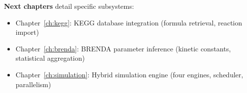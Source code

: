 \textbf{Next chapters} detail specific subsystems:

\begin{itemize}
    \item Chapter~\ref{ch:kegg}: KEGG database integration (formula retrieval, reaction import)
    \item Chapter~\ref{ch:brenda}: BRENDA parameter inference (kinetic constants, statistical aggregation)
    \item Chapter~\ref{ch:simulation}: Hybrid simulation engine (four engines, scheduler, parallelism)
\end{itemize}
